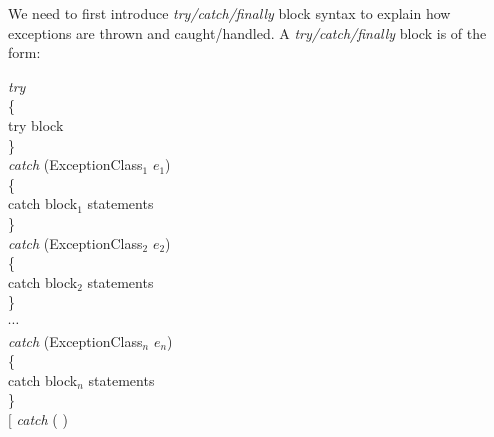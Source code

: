 We need to first introduce \emph{try/catch/finally} block syntax
to explain how exceptions are thrown and caught/handled. A
\emph{try/catch/finally} block is of the form:

{\codesnippetfont

\noindent \hspace*{0.5in} \emph{try}\\
\hspace*{0.5in} \{\\
\hspace*{0.5in} \hspace*{0.2in} try block\\
\hspace*{0.5in} \}\\
\hspace*{0.5in} \emph{catch} (ExceptionClass$_1$ $e_1$)\\
\hspace*{0.5in} \{\\
\hspace*{0.5in} \hspace*{0.2in} catch block$_1$ statements\\
\hspace*{0.5in} \}\\
\hspace*{0.5in} \emph{catch} (ExceptionClass$_2$ $e_2$)\\
\hspace*{0.5in} \{\\
\hspace*{0.5in} \hspace*{0.2in} catch block$_2$ statements\\
\hspace*{0.5in} \}\\
\hspace*{0.5in} \hspace*{0.2in} $\cdots$\\
\hspace*{0.5in} \emph{catch} (ExceptionClass$_n$ $e_n$)\\
\hspace*{0.5in} \{\\
\hspace*{0.5in} \hspace*{0.2in} catch block$_n$ statements\\
\hspace*{0.5in} \} \\
\hspace*{0.5in} $[$ \emph{catch} ( )\\
}
